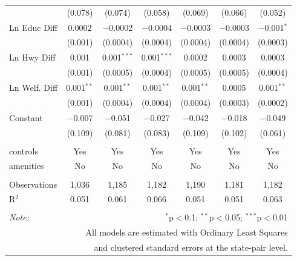 \begin{table}[!htbp]
\begin{tabular}{@{\extracolsep{5pt}}lcccccc}
  & (0.078) & (0.074) & (0.058) & (0.069) & (0.066) & (0.052) \\ 
  Ln Educ Diff & 0.0002 & $-$0.0002 & $-$0.0004 & $-$0.0003 & $-$0.0003 & $-$0.001$^{*}$ \\ 
  & (0.001) & (0.0004) & (0.0004) & (0.0004) & (0.0004) & (0.0003) \\ 
  Ln Hwy Diff & 0.001 & 0.001$^{***}$ & 0.001$^{***}$ & 0.0002 & 0.0003 & 0.0003 \\ 
  & (0.001) & (0.0005) & (0.0004) & (0.0005) & (0.0005) & (0.0004) \\ 
  Ln Welf. Diff & 0.001$^{**}$ & 0.001$^{**}$ & 0.001$^{**}$ & 0.001$^{**}$ & 0.0005 & 0.001$^{**}$ \\ 
  & (0.001) & (0.0004) & (0.0004) & (0.0004) & (0.0003) & (0.0002) \\ 
  Constant & $-$0.007 & $-$0.051 & $-$0.027 & $-$0.042 & $-$0.018 & $-$0.049 \\ 
  & (0.109) & (0.081) & (0.083) & (0.109) & (0.102) & (0.061) \\ 
 \hline \\[-1.8ex] 
controls & Yes & Yes & Yes & Yes & Yes & Yes \\ 
amenities & No & No & No & No & No & No \\ 
\hline \\[-1.8ex] 
Observations & 1,036 & 1,185 & 1,182 & 1,190 & 1,181 & 1,182 \\ 
R$^{2}$ & 0.051 & 0.061 & 0.066 & 0.051 & 0.051 & 0.063 \\ 
\hline 
\hline \\[-1.8ex] 
\textit{Note:}  & \multicolumn{6}{r}{$^{*}$p$<$0.1; $^{**}$p$<$0.05; $^{***}$p$<$0.01} \\ 
 & \multicolumn{6}{r}{All models are estimated with Ordinary Least Squares} \\ 
 & \multicolumn{6}{r}{and clustered standard errors at the state-pair level.} \\ 
\end{tabular} 
\end{table} 
